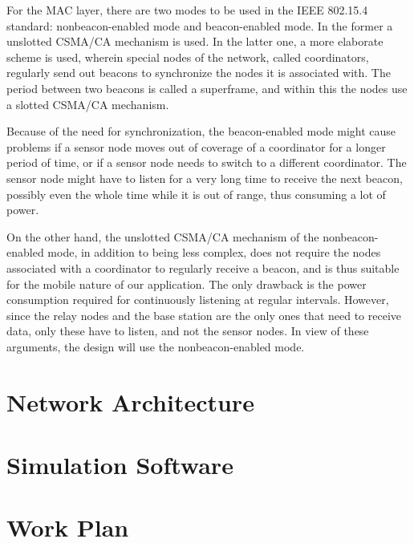 \documentclass[conference]{IEEEtran}
\begin{document}
For the MAC layer, there are two modes to be used in the IEEE 802.15.4
standard: nonbeacon-enabled mode and beacon-enabled mode. In the former
a unslotted CSMA/CA mechanism is used. In the latter one, a more elaborate
scheme is used, wherein special nodes of the network, called coordinators,
regularly send out beacons to synchronize the nodes it is associated with. The
period between two beacons is called a superframe, and within this the nodes
use a slotted CSMA/CA mechanism.

Because of the need for synchronization, the beacon-enabled mode might cause
problems if a sensor node moves out of coverage of a coordinator for a longer
period of time, or if a sensor node needs to switch to a different coordinator.
The sensor node might have to listen for a very long time to receive the next
beacon, possibly even the whole time while it is out of range, thus consuming
a lot of power.

On the other hand, the unslotted CSMA/CA mechanism of the nonbeacon-enabled
mode, in addition to being less complex, does not require the nodes associated
with a coordinator to regularly receive a beacon, and is thus suitable for the
mobile nature of our application. The only drawback is the power consumption
required for continuously listening at regular intervals.  However, since the
relay nodes and the base station are the only ones that need to receive data,
only these have to listen, and not the sensor nodes. In view of these
arguments, the design will use the nonbeacon-enabled mode.



\section{Network Architecture}


\section{Simulation Software}


\section{Work Plan}
\end{document}
